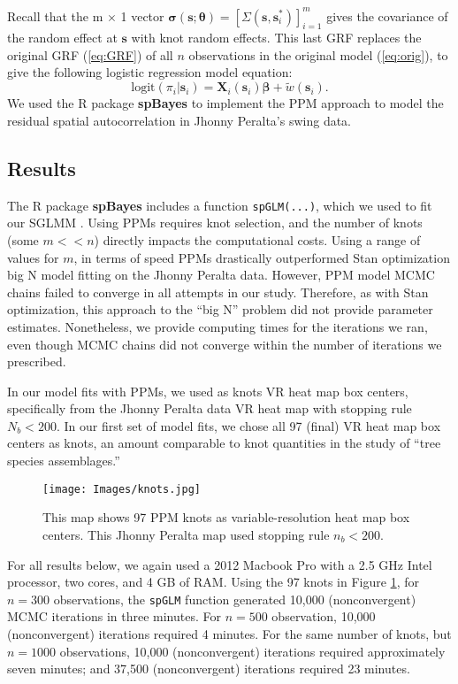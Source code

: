 Recall that the m $\times$ 1 vector $\pmb{\sigma}(\pmb{s};\pmb{\theta}) = \left[\Sigma(\pmb{s}, \pmb{s}_{i}^{*})\right]_{i = 1}^{m}$ gives the covariance of the random effect at $\pmb{s}$ with knot random effects. This last GRF replaces the original GRF (\ref{eq:GRF}) of all $n$ observations in the original model (\ref{eq:orig}), to give the following logistic regression model equation:
\begin{equation}
\text{logit}(\pi_{i}|\pmb{s}_{i}) = \pmb{X}_{i}(\pmb{s}_{i}) \pmb{\beta} + \widetilde{w}(\pmb{s}_{i}).
\end{equation}
We used the R package {\bf spBayes} \citep{Finley2013} to implement the PPM approach to model the residual spatial autocorrelation in Jhonny Peralta's swing data. 

\subsection{Results} \label{PPMresults}

The R package {\bf spBayes} includes a function \verb|spGLM(...)|, which we used to fit our SGLMM \citep{Finley2013}. Using PPMs requires knot selection, and the number of knots (some $m < < n$) directly impacts the computational costs. Using a range of values for $m$, in terms of speed PPMs drastically outperformed Stan optimization big N model fitting on the Jhonny Peralta data. However, PPM model MCMC chains failed to converge in all attempts in our study. Therefore, as with Stan optimization, this approach to the ``big N'' problem did not provide parameter estimates. Nonetheless, we provide computing times for the iterations we ran, even though MCMC chains did not converge within the number of iterations we prescribed.

In our model fits with PPMs, we used as knots VR heat map box centers, specifically from the Jhonny Peralta data VR heat map with stopping rule $N_{b} < 200$. In our first set of model fits, we chose all 97 (final) VR heat map box centers as knots, an amount comparable to knot quantities in the \cite{Finley2009_2} study of ``tree species assemblages.'' 
  \begin{figure}[H]
	\centering 
	\texttt{[image: Images/knots.jpg]}
	\caption{This map shows 97 PPM knots as variable-resolution heat map box centers. This Jhonny Peralta map used stopping rule $n_{b} < 200$.}
	\label{fig:knots}
	\end{figure}
For all results below, we again used a 2012 Macbook Pro with a 2.5 GHz Intel processor, two cores, and 4 GB of RAM. Using the 97 knots in Figure \ref{fig:knots}, for $n = 300$ observations, the \verb|spGLM| function generated 10,000 (nonconvergent) MCMC iterations in three minutes. For $n = 500$ observation, 10,000 (nonconvergent) iterations required 4 minutes. For the same number of knots, but $n = 1000$ observations, 10,000 (nonconvergent) iterations required approximately seven minutes; and 37,500 (nonconvergent) iterations required 23 minutes. 

